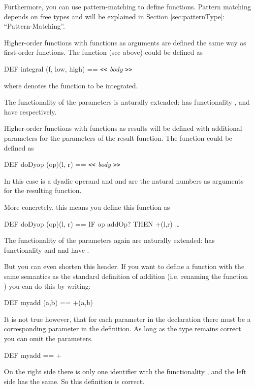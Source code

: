 Furthermore, you can use pattern-matching to define functions. Pattern
matching depends on free types and will be explained in Section
\ref{sec:patternType}: ``Pattern-Matching''.

\medskip
Higher-order functions with functions as arguments are defined the
same way as first-order functions. 
The function  (see above) could be defined as
\begin{prog}
        DEF integral (f, low, high) == {\em \verb+<<+ body \verb+>>+\/}
\end{prog}
where  denotes the function to be integrated.

The functionality of the parameters is naturally extended:  has
functionality ,  and  have
 respectively.

Higher-order functions with functions as results will be defined with
additional parameters for the parameters of the result function.
The function  could be
defined as 
\begin{prog}
        DEF doDyop (op)(l, r) == {\em \verb+<<+ body \verb+>>+\/}
\end{prog}
In this case  is a dyadic operand and  and  are
the natural numbers as arguments for the resulting function.

More concretely, this means you define this function as 
\begin{prog}
        DEF doDyop (op)(l, r) == IF op addOp? THEN +(l,r)
                                 \dots
\end{prog}
The functionality of the parameters again are naturally extended: 
has functionality  and  and  have .

But you can even shorten this header.
 If you want to define a function  with the
same semantics as the standard definition of addition (i.e. renaming
the function \pro{+}) you can do this by  writing:
\begin{prog}
        DEF myadd (a,b) == +(a,b)
\end{prog}
It is not true however, that for each parameter in the declaration there
must be a corresponding parameter in the definition.
As long as the type remains correct you can omit the parameters.
\begin{prog}
        DEF myadd == +
\end{prog}
On the right side there is only one identifier with the functionality
, and the left side has the same. 
So this definition is correct. 

